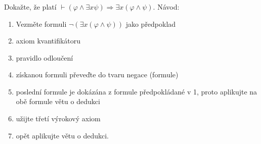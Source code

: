 \subsubsection{}
Dokažte, že platí $\vdash (\varphi \wedge \exists x \psi) \Rightarrow \exists
x(\varphi \wedge \psi)$. Návod:

\begin{enumerate}
  \item Vezměte formuli $\neg ( \exists x(\varphi \wedge \psi))$ jako předpoklad
  \item axiom kvantifikátoru
  \item pravidlo odloučení
  \item získanou formuli převeďte do tvaru negace (formule)
  \item poslední formule je dokázána z formule předpokládané v 1, proto
  aplikujte na obě formule větu o dedukci
  \item užijte třetí výrokový axiom
  \item opět aplikujte větu o dedukci.
\end{enumerate}
